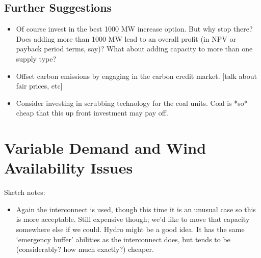 \documentclass{article}
\begin{document}
    
   	\subsection{Further Suggestions}
    
    \begin{itemize}
    
    	\item Of course invest in the best 1000 MW increase option.  But why stop there?  Does adding more than 1000 MW lead to an overall profit (in NPV or payback period terms, say)?  What about adding capacity to more than one supply type?
    	
        \item Offset carbon emissions by engaging in the carbon credit market.  [talk about fair prices, etc]
        
        \item Consider investing in scrubbing technology for the coal units.  Coal is *so* cheap that this up front investment may pay off.
    
    \end{itemize}
    
    
    
    \section{Variable Demand and Wind Availability Issues}
	
    \begin{table}[H]
    	\centering
    \end{table}
    
    \begin{figure}[H]
        \centering
    \end{figure}
    
    
    Sketch notes:
    
    \begin{itemize}
    	
        \item  Again the interconnect is used, though this time it is an unusual case so this is more acceptable.  Still expensive though; we'd like to move that capacity somewhere else if we could.  Hydro might be a good idea.  It has the same `emergency buffer' abilities as the interconnect does, but tends to be (considerably? how much exactly?) cheaper.
    
    \end{itemize}
    
\end{document}
